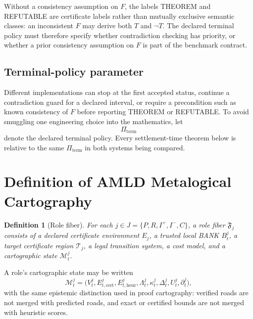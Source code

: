 \documentclass[11pt]{article}
\newtheorem{definition}{Definition}[section]
\begin{document}
Without a consistency assumption on $F$, the labels THEOREM and REFUTABLE are certificate labels rather than mutually exclusive semantic classes: an inconsistent $F$ may derive both $T$ and $\neg T$. The declared terminal policy must therefore specify whether contradiction checking has priority, or whether a prior consistency assumption on $F$ is part of the benchmark contract.

\subsection{Terminal-policy parameter}

Different implementations can stop at the first accepted status, continue a contradiction guard for a declared interval, or require a precondition such as known consistency of $F$ before reporting THEOREM or REFUTABLE. To avoid smuggling one engineering choice into the mathematics, let
\[
\Pi_{\mathrm{term}}
\]
denote the declared terminal policy. Every settlement-time theorem below is relative to the same $\Pi_{\mathrm{term}}$ in both systems being compared.

\section{Definition of AMLD Metalogical Cartography}

\begin{definition}[Role fiber]
For each $j\in J=\{P,R,I^+,I^-,C\}$, a \emph{role fiber} $\mathfrak F_j$ consists of a declared certificate environment $E_j$, a trusted local BANK $B_t^j$, a target certificate region $\mathcal T_j$, a legal transition system, a cost model, and a cartographic state $\mathcal M_t^j$.
\end{definition}

A role's cartographic state may be written
\[
\mathcal M_t^j=
\bigl(V_t^j,E_{t,\mathrm{cert}}^j,E_{t,\mathrm{heur}}^j,
\Lambda_t^j,\kappa_t^j,\Delta_t^j,U_t^j,\partial_t^j\bigr),
\]
with the same epistemic distinction used in proof cartography: verified roads are not merged with predicted roads, and exact or certified bounds are not merged with heuristic scores.
\end{document}

